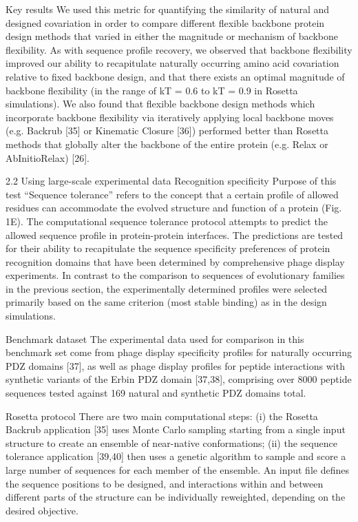Key results
We used this metric for quantifying the similarity of natural and designed covariation in order to compare different flexible backbone protein design methods that varied in either the magnitude or mechanism of backbone flexibility. As with sequence profile recovery, we observed that backbone flexibility improved our ability to recapitulate naturally occurring amino acid covariation relative to fixed backbone design, and that there exists an optimal magnitude of backbone flexibility (in the range of kT = 0.6 to kT = 0.9 in Rosetta simulations). We also found that flexible backbone design methods which incorporate backbone flexibility via iteratively applying local backbone moves (e.g. Backrub [35] or Kinematic Closure [36]) performed better than Rosetta methods that globally alter the backbone of the entire protein (e.g. Relax or AbInitioRelax) [26].

2.2 Using large-scale experimental data
Recognition specificity
Purpose of this test
“Sequence tolerance” refers to the concept that a certain profile of allowed residues can accommodate the evolved structure and function of a protein (Fig. 1E). The computational sequence tolerance protocol attempts to predict the allowed sequence profile in protein-protein interfaces. The predictions are tested for their ability to recapitulate the sequence specificity preferences of protein recognition domains that have been determined by comprehensive phage display experiments. In contrast to the comparison to sequences of evolutionary families in the previous section, the experimentally determined profiles were selected primarily based on the same criterion (most stable binding) as in the design simulations.

Benchmark dataset
The experimental data used for comparison in this benchmark set come from phage display specificity profiles for naturally occurring PDZ domains [37], as well as phage display profiles for peptide interactions with synthetic variants of the Erbin PDZ domain [37,38], comprising over 8000 peptide sequences tested against 169 natural and synthetic PDZ domains total.

Rosetta protocol
There are two main computational steps: (i) the Rosetta Backrub application [35] uses Monte Carlo sampling starting from a single input structure to create an ensemble of near-native conformations; (ii) the sequence tolerance application [39,40] then uses a genetic algorithm to sample and score a large number of sequences for each member of the ensemble. An input file defines the sequence positions to be designed, and interactions within and between different parts of the structure can be individually reweighted, depending on the desired objective.

